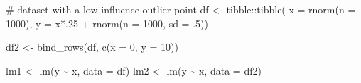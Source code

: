 \documentclass[
  letterpaper,
  DIV=11,
  numbers=noendperiod]{scrreport}
\newenvironment{Shaded}{\begin{snugshade}}{\end{snugshade}}
\newcommand{\AttributeTok}[1]{\textcolor[rgb]{0.40,0.45,0.13}{#1}}
\newcommand{\CommentTok}[1]{\textcolor[rgb]{0.37,0.37,0.37}{#1}}
\newcommand{\DecValTok}[1]{\textcolor[rgb]{0.68,0.00,0.00}{#1}}
\newcommand{\FunctionTok}[1]{\textcolor[rgb]{0.28,0.35,0.67}{#1}}
\newcommand{\NormalTok}[1]{\textcolor[rgb]{0.00,0.23,0.31}{#1}}
\newcommand{\OtherTok}[1]{\textcolor[rgb]{0.00,0.23,0.31}{#1}}
\newcommand{\SpecialCharTok}[1]{\textcolor[rgb]{0.37,0.37,0.37}{#1}}
\begin{document}
\begin{Shaded}
\begin{Highlighting}[]
\CommentTok{\# dataset with a low{-}influence outlier point }
\NormalTok{df }\OtherTok{\textless{}{-}}\NormalTok{ tibble}\SpecialCharTok{::}\FunctionTok{tibble}\NormalTok{(}
  \AttributeTok{x =} \FunctionTok{rnorm}\NormalTok{(}\AttributeTok{n =} \DecValTok{1000}\NormalTok{),}
  \AttributeTok{y =}\NormalTok{ x}\SpecialCharTok{*}\NormalTok{.}\DecValTok{25} \SpecialCharTok{+} \FunctionTok{rnorm}\NormalTok{(}\AttributeTok{n =} \DecValTok{1000}\NormalTok{, }\AttributeTok{sd =}\NormalTok{ .}\DecValTok{5}\NormalTok{))}

\NormalTok{df2 }\OtherTok{\textless{}{-}} \FunctionTok{bind\_rows}\NormalTok{(df, }\FunctionTok{c}\NormalTok{(}\AttributeTok{x =} \DecValTok{0}\NormalTok{, }\AttributeTok{y =} \DecValTok{10}\NormalTok{))}

\NormalTok{lm1 }\OtherTok{\textless{}{-}} \FunctionTok{lm}\NormalTok{(y }\SpecialCharTok{\textasciitilde{}}\NormalTok{ x, }\AttributeTok{data =}\NormalTok{ df)}
\NormalTok{lm2 }\OtherTok{\textless{}{-}} \FunctionTok{lm}\NormalTok{(y }\SpecialCharTok{\textasciitilde{}}\NormalTok{ x, }\AttributeTok{data =}\NormalTok{ df2)}


\end{Highlighting}
\end{Shaded}
\end{document}

